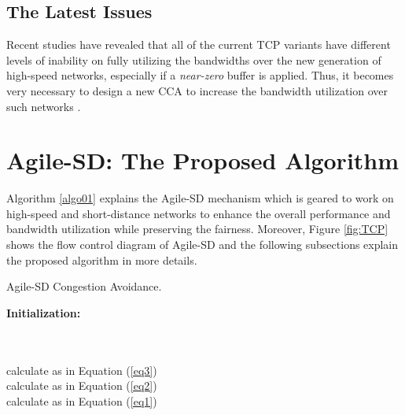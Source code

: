 \documentclass[preprint,3p,times,twocolumn,authoryear]{elsarticle}
\begin{document}
\subsection{The Latest Issues}
Recent studies have revealed that all of the current TCP variants have different levels of inability on fully utilizing the bandwidths over the new generation of high-speed networks, especially if a \emph{near-zero} buffer is applied. Thus, it becomes very necessary to design a new CCA to increase the bandwidth utilization over such networks \citep{Afanasyev2010, alrshah2014}.




\section{Agile-SD: The Proposed Algorithm}
\label{Agile-SD}

Algorithm \ref{algo01} explains the Agile-SD mechanism which is geared to work on high-speed and short-distance networks to enhance the overall performance and bandwidth utilization while preserving the fairness. Moreover, Figure \ref{fig:TCP} shows the flow control diagram of Agile-SD and the following subsections explain the proposed algorithm in more details.

\begin{algorithm}[t!]
\caption{Agile-SD Congestion Avoidance.}\label{algo01}

\textbf{Initialization:}\\
\hspace{0.5cm}\\
	\hspace{0.5cm}\\
	\hspace{0.5cm}

{
	calculate  as in Equation (\ref{eq3})\\
	
	calculate  as in Equation (\ref{eq2})\\

	calculate  as in Equation (\ref{eq1})\\

	


	\\
}

{
	\\
	
	\uIf {}
	{	
		 \label{L13}\\
	}
	\Else
	{
		 \label{L17}\\
	}
	
	\\
	\\
}
\end{algorithm} \DecMargin{1em}
\end{document}
